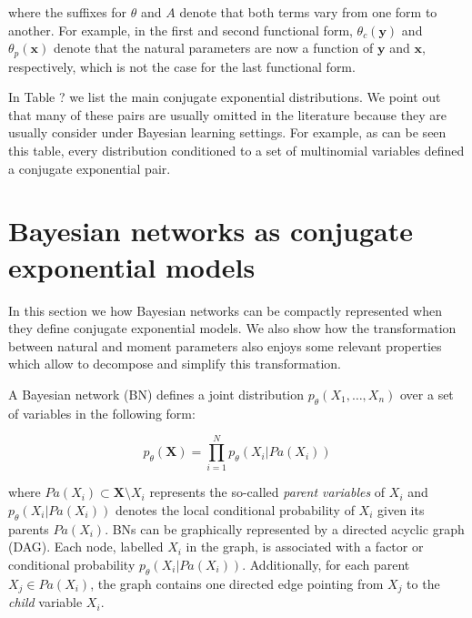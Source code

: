 \documentclass[11pt, oneside]{article}   	%
\newcommand{\bm}{\mathbf}
\numberwithin{figure}{section}
\numberwithin{equation}{section}
\numberwithin{table}{section}
\theoremstyle{definition}
\begin{document}
\noindent where the suffixes for $\theta$ and $A$ denote that both terms vary from one form to another. For example, in the first and second functional form, $\theta_c(\bm y)$ and $\theta_p(\bm x)$ denote that the natural parameters are now a function of $\bm y$ and $\bm x$, respectively, which is not the case for the last functional form. 

In Table ? we list the main conjugate exponential distributions. We point out that many of these pairs are usually omitted in the literature because they are usually consider under Bayesian learning settings. For example, as can be seen this table, every distribution conditioned to a set of multinomial variables defined a conjugate exponential pair. 



\section{Bayesian networks as conjugate exponential models}\label{Section:CEFBN}

In this section we how Bayesian networks can be compactly represented when they define conjugate exponential models. We also show how the transformation between natural and moment parameters also enjoys some relevant properties which allow to decompose and simplify this transformation. 

A Bayesian network (BN) defines a joint distribution $p_\theta(X_1,\ldots,X_n)$ over a set of variables in the following form:

$$ p_\theta(\bm X) = \prod_{i=1}^N p_{\theta}(X_i|Pa(X_i))$$ 

\noindent where $Pa(X_i)\subset \bm X\setminus X_i$ represents the so-called \emph{parent variables} of $X_i$ and $p_{\theta}(X_i|Pa(X_i))$ denotes the local conditional probability of $X_i$ given its parents $Pa(X_i)$. BNs can be graphically represented by a directed acyclic graph (DAG). Each node, labelled $X_i$ in the graph, is associated with a factor or conditional probability $p_\theta(X_i|Pa(X_i))$. Additionally, for each parent $X_j \in Pa(X_i)$, the graph contains one directed edge pointing from $X_j$ to the \emph{child} variable $X_i$.
\end{document}
